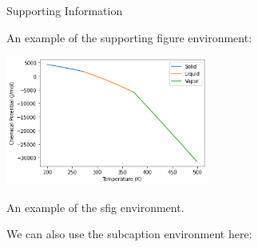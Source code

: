 \begin{center}
    \LARGE Supporting Information
\end{center}
An example of the supporting figure environment:\\
\begin{sfig}[H]
    \centering
    \includegraphics[width=0.5\textwidth,keepaspectratio]{figures/equilibriumplot.png}
    \caption{
    An example of the sfig environment.
    }
    \label{sfig:example}
\end{sfig}
We can also use the subcaption environment here:\\
